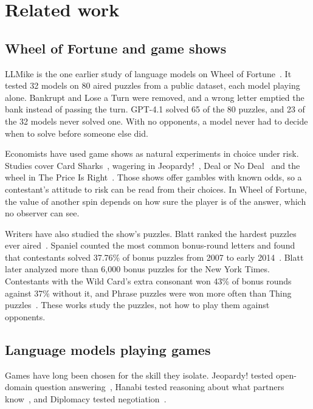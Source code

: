 \section{Related work}\label{sec:related-work}

\subsection{Wheel of Fortune and game shows}

LLMike is the one earlier study of language models on Wheel of Fortune~\citep{llmike}. It tested 32 models on 80 aired puzzles from a public dataset, each model playing alone. Bankrupt and Lose a Turn were removed, and a wrong letter emptied the bank instead of passing the turn. GPT-4.1 solved 65 of the 80 puzzles, and 23 of the 32 models never solved one. With no opponents, a model never had to decide when to solve before someone else did.

Economists have used game shows as natural experiments in choice under risk. Studies cover Card Sharks~\citep{gertner1993}, wagering in Jeopardy!~\citep{metrick1995}, Deal or No Deal~\citep{post2008} and the wheel in The Price Is Right~\citep{pacheco2023}. Those shows offer gambles with known odds, so a contestant's attitude to risk can be read from their choices. In Wheel of Fortune, the value of another spin depends on how sure the player is of the answer, which no observer can see.

Writers have also studied the show's puzzles. Blatt ranked the hardest puzzles ever aired~\citep{blatt2014}. Spaniel counted the most common bonus-round letters and found that contestants solved 37.76\% of bonus puzzles from 2007 to early 2014~\citep{spaniel2013,spaniel2014}. Blatt later analyzed more than 6,000 bonus puzzles for the New York Times. Contestants with the Wild Card's extra consonant won 43\% of bonus rounds against 37\% without it, and Phrase puzzles were won more often than Thing puzzles~\citep{upshot2023}. These works study the puzzles, not how to play them against opponents.

\subsection{Language models playing games}

Games have long been chosen for the skill they isolate. Jeopardy! tested open-domain question answering~\citep{ferrucci2010}, Hanabi tested reasoning about what partners know~\citep{bard2020}, and Diplomacy tested negotiation~\citep{cicero2022}.

